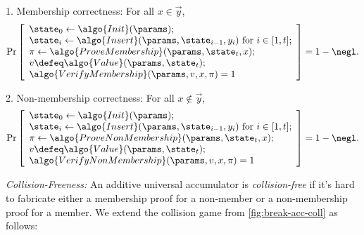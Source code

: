 \begin{mysolution}
  1. Membership correctness: For all $x \in \vec{y}$,
  \[
    \Pr\left[
    \begin{array}{l}
      \state_0 \gets \algo{Init}(\params); \\
      \state_i \gets \algo{Insert}(\params, \state_{i-1}, y_i) \text{ for } i \in [1, t]; \\
      \pi \gets \algo{ProveMembership}(\params, \state_t, x); \\
      v \defeq \algo{Value}(\params, \state_t); \\
      \algo{VerifyMembership}(\params, v, x, \pi) = 1
    \end{array}
    \right] = 1 - \negl.
  \]
  
  2. Non-membership correctness: For all $x \notin \vec{y}$,
  \[
    \Pr\left[
    \begin{array}{l}
      \state_0 \gets \algo{Init}(\params); \\
      \state_i \gets \algo{Insert}(\params, \state_{i-1}, y_i) \text{ for } i \in [1, t]; \\
      \pi \gets \algo{ProveNonMembership}(\params, \state_t, x); \\
      v \defeq \algo{Value}(\params, \state_t); \\
      \algo{VerifyNonMembership}(\params, v, x, \pi) = 1
    \end{array}
    \right] = 1 - \negl.
  \]
  
  \emph{Collision-Freeness:} An additive universal accumulator is \emph{collision-free} if it's hard to fabricate either a membership proof for a non-member or a non-membership proof for a member.
  We extend the collision game from \autoref{fig:break-acc-coll} as follows:
  
  \begin{center}
    \begin{tcolorbox}[width=13cm]
      \begin{pcvstack}[center]
      \end{pcvstack}
    \end{tcolorbox}
  \end{center}
  

\end{mysolution}
